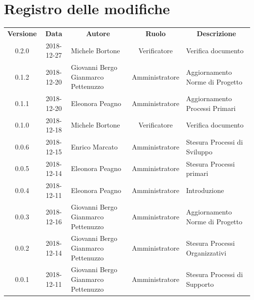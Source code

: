 \documentclass[11pt,a4paper]{article}
\begin{document}
	

	
	\newpage
	\section*{\centering Registro delle modifiche}
	\begin{tabularx}{\textwidth}{ c | c | X | c | X }
		\rowcolor{LightBlue}
		\color{white}\bfseries Versione & \color{white}\bfseries Data & \multicolumn{1}{c}{\color{white}\bfseries Autore}
		 & \color{white}\bfseries Ruolo & \multicolumn{1}{c}{\color{white}\bfseries Descrizione}\\[0.25cm]
		 0.2.0 & 2018-12-27 & Michele Bortone & Verificatore & Verifica documento \\ \hline
		0.1.2 & 2018-12-20 & Giovanni Bergo \newline Gianmarco Pettenuzzo & Amministratore & Aggiornamento Norme di Progetto \\ \hline
		0.1.1 & 2018-12-20 & Eleonora Peagno & Amministratore & Aggiornamento Processi Primari \\ \hline
		0.1.0 & 2018-12-18 & Michele Bortone & Verificatore & Verifica documento \\ \hline
		0.0.6 & 2018-12-15 & Enrico Marcato & Amministratore & Stesura Processi di \newline Sviluppo \\ \hline
		0.0.5 & 2018-12-14 & Eleonora Peagno & Amministratore & Stesura Processi primari \\ \hline
		0.0.4 & 2018-12-11 & Eleonora Peagno & Amministratore & Introduzione \\ \hline
	0.0.3 & 2018-12-16 & Giovanni Bergo \newline Gianmarco Pettenuzzo & Amministratore & Aggiornamento Norme di Progetto \\ \hline
	0.0.2 & 2018-12-14 & Giovanni Bergo \newline Gianmarco Pettenuzzo & Amministratore & Stesura Processi \newline Organizzativi \\ \hline
	0.0.1 & 2018-12-11 & Giovanni Bergo \newline Gianmarco Pettenuzzo & Amministratore & Stesura Processi di \newline Supporto \\ \hline


	
		
	
	\end{tabularx}
\end{document}
